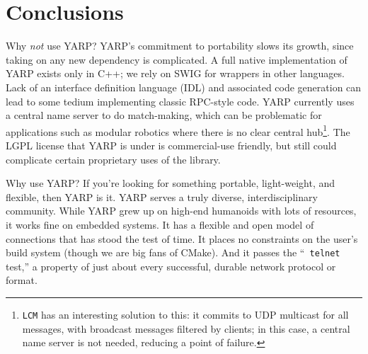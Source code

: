\documentclass[letterpaper]{article}
\begin{document}
\section{Conclusions}

Why {\it not} use YARP?  
YARP's commitment to portability slows its growth, since taking on any
new dependency is complicated.  
A full native implementation of YARP
exists only in C++; we rely on SWIG for wrappers in other languages.
Lack of an interface definition
language (IDL) and associated code generation can lead to some tedium
implementing classic RPC-style code. YARP currently uses
a central name server to do match-making, which can be 
problematic for applications such as modular
robotics where there is no clear central hub\footnote{{\tt LCM}
\cite{huang2010lcm} has an interesting
solution to this: it commits to UDP multicast for all messages,
with broadcast messages filtered by clients; in this case, 
a central name server is not needed, reducing a point of
failure.}.
The LGPL license that YARP is
under is commercial-use friendly, but still could
complicate certain proprietary uses of the library.

Why use YARP?  If you're looking for something portable, light-weight,
and flexible, then YARP is it.  YARP serves a truly diverse,
interdisciplinary community.  While YARP grew up on
high-end humanoids with lots of resources, it works fine on embedded
systems.  It has a flexible and open model of connections that has
stood the test of time.  It places no constraints on the user's build
system (though we are big fans of CMake).  And it passes the ``{\tt
  telnet} test,'' a property of just about
every successful, durable network protocol or
format.



\end{document}
